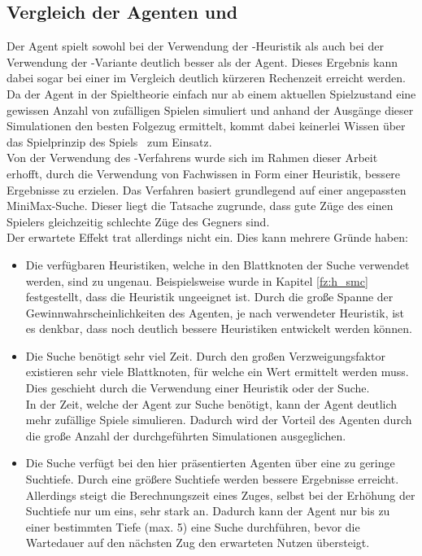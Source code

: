 \subsection{Vergleich der Agenten \mxZitat{\mc} und \mxZitat{\abp}}
\label{subsec:Fazit:AgentenVgl}
Der \mxZitat{\mc} Agent spielt sowohl bei der Verwendung der -Heuristik als auch bei der Verwendung der \mc -Variante deutlich besser als der \mxZitat{\abp} Agent. Dieses Ergebnis kann dabei sogar bei einer im Vergleich deutlich kürzeren Rechenzeit erreicht werden.
\\Da der \mxZitat{\mc} Agent in der Spieltheorie einfach nur ab einem aktuellen Spielzustand eine gewissen Anzahl von zufälligen Spielen simuliert und anhand der Ausgänge dieser Simulationen den besten Folgezug ermittelt, kommt dabei keinerlei Wissen über das Spielprinzip des Spiels \ot\ zum Einsatz. 
\\Von der Verwendung des \mxZitat{\abab}-Verfahrens wurde sich im Rahmen dieser Arbeit erhofft, durch die Verwendung von Fachwissen in Form einer Heuristik, bessere Ergebnisse zu erzielen. Das Verfahren basiert grundlegend auf einer angepassten MiniMax-Suche. Dieser liegt die Tatsache zugrunde, dass gute Züge des einen Spielers gleichzeitig schlechte Züge des Gegners sind.
\\Der erwartete Effekt trat allerdings nicht ein. Dies kann mehrere Gründe haben:
\begin{itemize}
\item Die verfügbaren Heuristiken, welche in den Blattknoten der \mxZitat{\abp} Suche verwendet werden, sind zu ungenau. Beispielsweise wurde in Kapitel \ref{fz:h_smc} festgestellt, dass die Heuristik  ungeeignet ist. Durch die große Spanne der Gewinnwahrscheinlichkeiten des \mxZitat{\abp} Agenten, je nach verwendeter Heuristik, ist es denkbar, dass noch deutlich bessere Heuristiken entwickelt werden können.
\item Die \mxZitat{\abp} Suche benötigt sehr viel Zeit. Durch den großen Verzweigungsfaktor existieren sehr viele Blattknoten, für welche ein Wert ermittelt werden muss. Dies geschieht durch die Verwendung einer Heuristik oder der \mxZitat{\mc} Suche.
\\In der Zeit, welche der \mxZitat{\abp} Agent zur Suche benötigt, kann der \mxZitat{\mc} Agent deutlich mehr zufällige Spiele simulieren. Dadurch wird der Vorteil des \mxZitat{\abp} Agenten durch die große Anzahl der durchgeführten Simulationen ausgeglichen.
\item Die \mxZitat{\abp} Suche verfügt bei den hier präsentierten Agenten über eine zu geringe Suchtiefe. Durch eine größere Suchtiefe werden bessere Ergebnisse erreicht. Allerdings steigt die Berechnungszeit eines Zuges, selbst bei der Erhöhung der Suchtiefe nur um eins, sehr stark an. Dadurch kann der Agent nur bis zu einer bestimmten Tiefe (max. 5) eine \mxZitat{\abp} Suche durchführen, bevor die Wartedauer auf den nächsten Zug den erwarteten Nutzen übersteigt. 
\end{itemize} 
